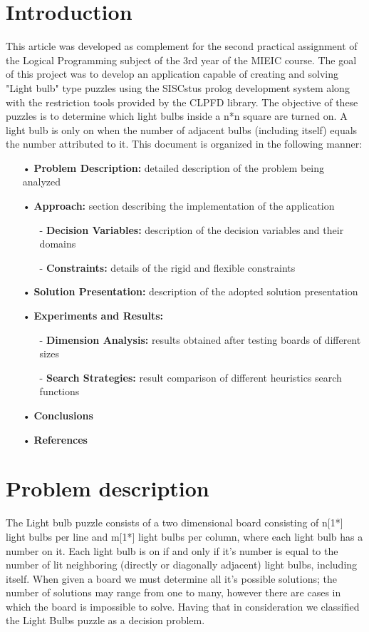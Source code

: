\documentclass[runningheads]{llncs}
\begin{document}
\section{Introduction}
This article was developed as complement for the second practical assignment of the Logical Programming subject of the 3rd year of the MIEIC course. The goal of this project was to develop an application capable of creating and solving "Light bulb" type puzzles using the SISCstus prolog development system along with the restriction tools provided by the CLPFD library. The objective of these puzzles is to determine which light bulbs inside a n*n square are turned on. A light bulb is only on when the number of adjacent bulbs (including itself) equals the number attributed to it. This document is organized in the following manner:
	\begin{itemize}
		\item[•] \textbf{Problem Description:} detailed description of the problem being analyzed
		\item[•] \textbf{Approach:} section describing the implementation of the application
		\begin{itemize}
			\item[-] \textbf{Decision Variables:} description of the decision variables and their domains
			\item[-] \textbf{Constraints:} details of the rigid and flexible constraints
		\end{itemize}
		\item[•] \textbf{Solution Presentation:} description of the adopted solution presentation
		\item[•] \textbf{Experiments and Results:}
		\begin{itemize}
			\item[-] \textbf{Dimension Analysis:} results obtained after testing boards of different sizes
			\item[-] \textbf{Search Strategies:} result comparison of different heuristics search functions
		\end{itemize}
		\item[•] \textbf{Conclusions}
		\item[•] \textbf{References}
	\end{itemize}

\section{Problem description}
The Light bulb puzzle consists of a two dimensional board consisting of n[1*] light bulbs per line and m[1*] light bulbs per column, where each light bulb has a number on it.
Each light bulb is on if and only if it's number is equal to the number of lit neighboring (directly or diagonally adjacent) light bulbs, including itself. When given a board we must determine all it's possible solutions; the number of solutions may range from one to many, however there are cases in which the board is impossible to solve. Having that in consideration we classified the Light Bulbs puzzle as a decision problem.
\end{document}
